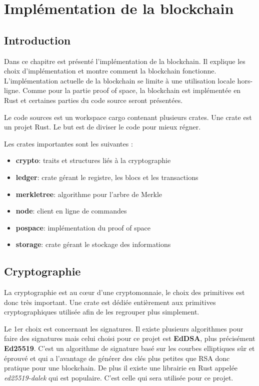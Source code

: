 \chapter{Implémentation de la blockchain}
\label{ch:realisation}

\section{Introduction}

Dans ce chapitre est présenté l'implémentation de la blockchain. Il explique les choix d'implémentation et montre comment la blockchain fonctionne. L'implémentation actuelle de la blockchain se limite à une utilisation locale hors-ligne. Comme pour la partie proof of space, la blockchain est implémentée en Rust et certaines parties du code source seront présentées.

Le code sources est un workspace cargo contenant plusieurs crates. Une crate est un projet Rust. Le but est de diviser le code pour mieux régner.

Les crates importantes sont les suivantes :

\begin{itemize}
  \item \textbf{crypto}: traits et structures liés à la cryptographie
  \item \textbf{ledger}: crate gérant le registre, les blocs et les transactions
  \item \textbf{merkletree}: algorithme pour l'arbre de Merkle
  \item \textbf{node}: client en ligne de commandes
  \item \textbf{pospace}: implémentation du proof of space
  \item \textbf{storage}: crate gérant le stockage des informations
\end{itemize}

\section{Cryptographie}

La cryptographie est au cœur d'une cryptomonnaie, le choix des primitives est donc très important. Une crate est dédiée entièrement aux primitives cryptographiques utilisée afin de les regrouper plus simplement.

Le 1er choix est concernant les signatures. Il existe plusieurs algorithmes pour faire des signatures mais celui choisi pour ce projet est \textbf{EdDSA}, plus précisément \textbf{Ed25519}. C'est un algorithme de signature basé sur les courbes elliptiques sûr et éprouvé et qui a l'avantage de générer des clés plus petites que RSA donc pratique pour une blockchain. De plus il existe une librairie en Rust appelée \emph{ed25519-dalek} qui est populaire. C'est celle qui sera utilisée pour ce projet.

